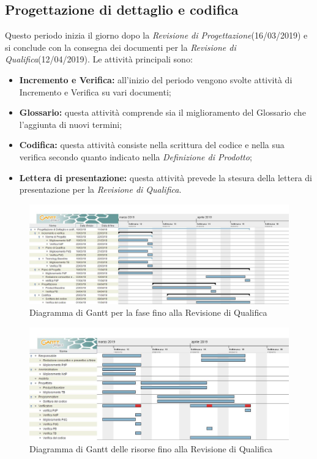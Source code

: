 \newpage
\subsection{Progettazione di dettaglio e codifica}
Questo periodo inizia il giorno dopo la \textit{Revisione di Progettazione}(16/03/2019) e si conclude
con la consegna dei documenti per la \textit{Revisione di Qualifica}(12/04/2019). Le attività principali sono:
\begin{itemize}
	\item{\textbf{Incremento e Verifica:} all’inizio del periodo vengono svolte attività di Incremento e Verifica su vari documenti;}
	\item{\textbf{Glossario:} questa attività comprende sia il miglioramento del Glossario che l’aggiunta di nuovi termini;}
	\item{\textbf{Codifica:} questa attività consiste nella scrittura del codice e nella sua verifica secondo quanto indicato nella \textit{Definizione di Prodotto};}
	\item{\textbf{Lettera di presentazione:} questa attività prevede la stesura della lettera di presentazione per la \textit{Revisione di Qualifica}.}
\end{itemize}

\begin{figure}[h!]
	\centering
	\includegraphics[width=\textwidth]{Gantt_terza_fase.jpg}
	\caption{Diagramma di Gantt per la fase fino alla Revisione di Qualifica}
\end{figure}

\begin{figure}[h!]
	\centering
	\includegraphics[width=\textwidth]{Gantt_terza_fase_risorse.jpg}
	\caption{Diagramma di Gantt delle risorse fino alla Revisione di Qualifica}
\end{figure}

